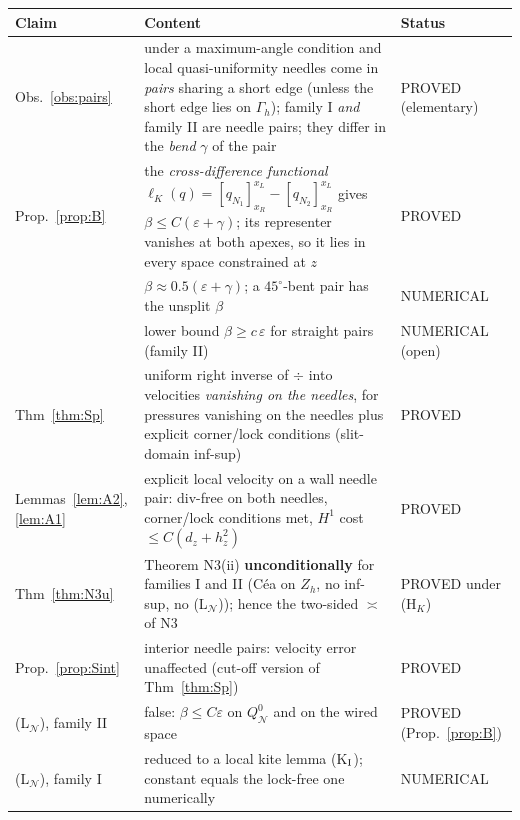 \documentclass[11pt]{article}
\theoremstyle{remark}
\newcommand{\Nset}{\mathcal N}
\begin{document}
\begin{center}\small\begin{tabular}{p{2.6cm}p{9.5cm}p{2.7cm}}
\toprule
Claim & Content & Status\\\midrule
Obs.~\ref{obs:pairs} & under a maximum-angle condition and local quasi-uniformity needles come in \emph{pairs} sharing a short edge (unless the short edge lies on $\Gamma_h$); family I \emph{and} family II are needle pairs; they differ in the \emph{bend} $\gamma$ of the pair & PROVED (elementary)\\
Prop.~\ref{prop:B} & the \emph{cross-difference functional} $\ell_K(q)=[q_{N_1}]_{x_R}^{x_L}-[q_{N_2}]_{x_R}^{x_L}$ gives $\beta\le C(\varepsilon+\gamma)$; its representer vanishes at both apexes, so it lies in every space constrained at $z$ & PROVED\\
& $\beta\approx0.5(\varepsilon+\gamma)$; a $45^\circ$-bent pair has the unsplit $\beta$ & NUMERICAL\\
& lower bound $\beta\ge c\,\varepsilon$ for straight pairs (family II) & NUMERICAL (open)\\
Thm~\ref{thm:Sp} & uniform right inverse of $\div$ into velocities \emph{vanishing on the needles}, for pressures vanishing on the needles plus explicit corner/lock conditions (slit-domain inf-sup) & PROVED\\
Lemmas~\ref{lem:A2}, \ref{lem:A1} & explicit local velocity on a wall needle pair: div-free on both needles, corner/lock conditions met, $H^1$ cost $\le C(d_z+h_z^2)$ & PROVED\\
Thm~\ref{thm:N3u} & Theorem N3(ii) \textbf{unconditionally} for families I and II (C\'ea on $Z_h$, no inf-sup, no (L$_\Nset$)); hence the two-sided $\asymp$ of N3 & PROVED under (H$_K$)\\
Prop.~\ref{prop:Sint} & interior needle pairs: velocity error unaffected (cut-off version of Thm~\ref{thm:Sp}) & PROVED\\
(L$_\Nset$), family II & false: $\beta\le C\varepsilon$ on $Q^0_\Nset$ and on the wired space & PROVED (Prop.~\ref{prop:B})\\
(L$_\Nset$), family I & reduced to a local kite lemma (K$_{\rm I}$); constant equals the lock-free one numerically & NUMERICAL\\
\bottomrule\end{tabular}\end{center}
\end{document}
